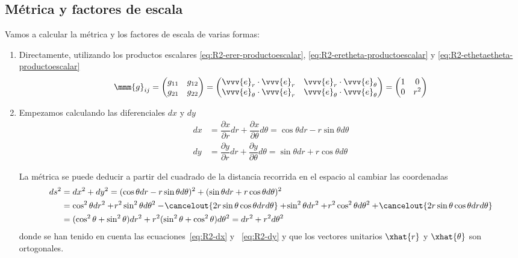 \subsection{Métrica y factores de escala}
Vamos a calcular la métrica y los factores de escala de varias formas:
\begin{enumerate}
\item Directamente, utilizando los productos escalares
  \eqref{eq:R2-erer-productoescalar}, \eqref{eq:R2-eretheta-productoescalar} y
   \eqref{eq:R2-ethetaetheta-productoescalar}
  \begin{equation}\label{eq:R2-metrica-polares}
    \mmm{g}_{ij}
    = \begin{pmatrix}
      g_{11} & g_{12}\\
      g_{21} & g_{22}
      \end{pmatrix}
    = \begin{pmatrix}
      \vvv{e}_r\cdot\vvv{e}_r & \vvv{e}_r\cdot\vvv{e}_\theta\\
      \vvv{e}_\theta\cdot\vvv{e}_r & \vvv{e}_\theta\cdot\vvv{e}_\theta
    \end{pmatrix}
    = \begin{pmatrix}
      1 & 0\\
      0 & r^2
    \end{pmatrix}
  \end{equation}
  
\item Empezamos calculando las diferenciales $dx$ y $dy$
  \begin{subequations}
    \begin{align}\label{eq:R2-dx}
      dx
      &=
        \dfrac{\partial x}{\partial r} dr + \dfrac{\partial x}{\partial\theta} d\theta
        = \cos\theta dr - r\sin\theta d\theta\\
      \label{eq:R2-dy}
      dy
      &=
        \dfrac{\partial y}{\partial r} dr + \dfrac{\partial y}{\partial\theta} d\theta
        = \sin\theta dr + r\cos\theta d\theta
    \end{align}
  \end{subequations}

La métrica se puede deducir a partir del cuadrado de la distancia recorrida en el
espacio al cambiar las coordenadas
{\footnotesize
  \begin{align*}
    ds^2
    &=
      dx^2 + dy^2
      = (\cos\theta dr - r\sin\theta d\theta)^2
      + (\sin\theta dr + r\cos\theta d\theta)^2\\
    &=
      \cos^2\theta dr^2
      + \!r^2\sin^2\theta d\theta^2
      - \!\cancelout{2r\sin\theta \cos\theta dr d\theta}
      + \!\sin^2\theta dr^2
      + \!r^2 \cos^2\theta d\theta^2
      + \!\cancelout{2r\sin\theta \cos\theta dr d\theta}\\
    &=
      (\cos^2\theta + \sin^2\theta) dr^2 + r^2(\sin^2\theta + \cos^2\theta) d\theta^2
      = dr^2 + r^2 d\theta^2
  \end{align*}
}
donde se han tenido en cuenta las ecuaciones~\eqref{eq:R2-dx} y ~\eqref{eq:R2-dy} y que
los vectores unitarios $\xhat{r}$ y $\xhat{\theta}$ son ortogonales.


\end{enumerate}

